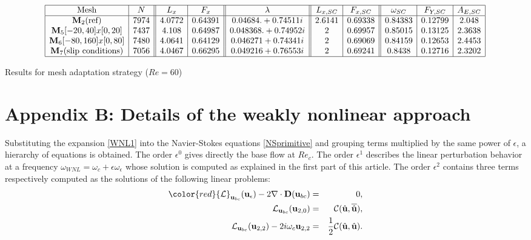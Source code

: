 \documentclass[twocolumn,10pt]{asme2ej}
\begin{document}
\begin{table*}
$$
\begin{array}{|c|c||c|c||c||c|c||c|c|c|}
\hline
\mbox{Mesh} & N & L_x & F_x & \lambda & L_{x,SC} & F_{x,SC} & \omega_{SC}  & F_{Y,SC} & A_{E,SC} \\
\hline
\mathbf{M}_2 \mbox{(ref)} 	& 7974  	& 4.0772 & 0.64391 	& 0.04684. +  0.74511i 	& 2.6141  & 0.69338 	& 0.84383 & 0.12799 & 2.048   \\ 
\mathbf{M}_5 [-20,40]x[0,20] 	& 7437	&  4.108 & 0.64987 	& 0.048368. +  0.74952i 	& 2  & 0.69957 	& 0.85015 & 0.13125 & 2.3638   \\ 
\mathbf{M}_6 [-80,160]x[0,80] 	& 7480	& 4.0641 & 0.64129		& 0.046271 + 0.74341i 	& 2 	& 0.69069 	& 0.84159 & 0.12653 & 2.4453 \\
\mathbf{M}_7 \mbox{(slip conditions)}	 & 7056	& 4.0467 &0.66295		& 0.049216+0.76553i 	& 2 	& 0.69241		& 0.8438  & 0.12716	 & 2.3202 \\
\hline
\end{array}
$$
\caption{Results for mesh adaptation strategy ($Re = 60$)}
\end{table*}

\section*{{\color{red}Appendix B: }Details of the weakly nonlinear approach}

Substituting the expansion \ref{WNL1} into the Navier-Stokes equations \ref{NSprimitive} and grouping terms multiplied by the same power of $\epsilon$, a hierarchy of equations is obtained. {\color{red} The order $\epsilon^0$ gives directly the base flow at $Re_c$. The order $\epsilon^1$ describes the linear perturbation behavior at a frequency $\omega_{WNL}=\omega_c+\epsilon\omega_\epsilon$ whose solution is computed as explained in the first part of this article.}
The order $\epsilon^2$ contains three terms respectively computed as the solutions of the following linear problems:
\begin{eqnarray}
{\color{red} {\cal L}_{{\bf u}_{bc}} ({\bf u}_\epsilon) - 2 \nabla \cdot {\bf D}({\bf u}_{bc})} &=&0,\\
{\cal L}_{{\bf u}_{bc}} ({\bf u}_{2,0}) &=& {\cal C}(\hat{\bf u},\overline{\hat{\bf u}}),\\
{\cal L}_{{\bf u}_{bc}} ({\bf u}_{2,2}) - 2 i \omega_c {\bf u}_{2,2}  &=& \frac{1}{2} {\cal C}(\hat{\bf u},\hat{\bf u}).
 \end{eqnarray}
\end{document}
